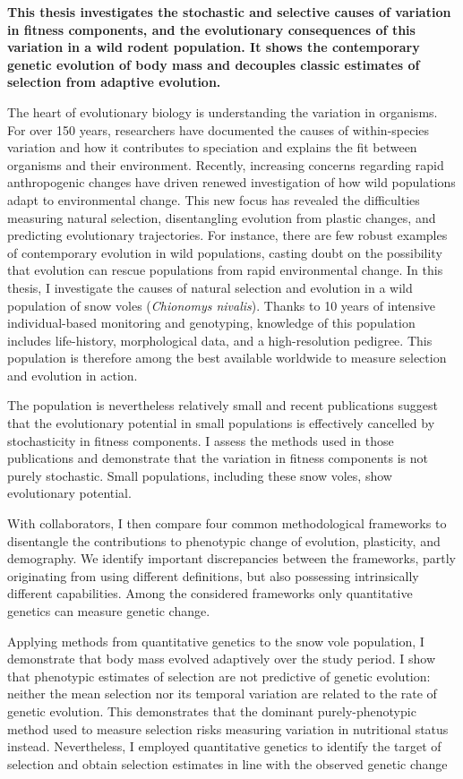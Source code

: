 \begin{summary}
\textbf{
This thesis investigates the stochastic and selective causes of variation in fitness components, and the evolutionary consequences of this variation in a wild rodent population. 
It shows the contemporary genetic evolution of body mass and decouples classic estimates of selection from adaptive evolution. 
}

The heart of evolutionary biology is understanding the variation in organisms. For over 150 years, researchers have documented the causes of within-species variation and how it contributes to speciation and explains the fit between organisms and their environment. 
Recently, increasing concerns regarding rapid anthropogenic changes have driven renewed investigation of how wild populations adapt to environmental change.
This new focus has revealed the difficulties measuring natural selection, disentangling evolution from plastic changes, and predicting evolutionary trajectories. 
For instance, there are few robust examples of contemporary evolution in wild populations, casting doubt on the possibility that evolution can rescue populations from rapid environmental change.
In this thesis, I investigate the causes of natural selection and evolution in a wild population of snow voles (\textit{Chionomys nivalis}). Thanks to 10 years of intensive individual-based monitoring and genotyping, knowledge of this population includes life-history, morphological data, and a high-resolution pedigree. This population is therefore among the best available worldwide to measure selection and evolution in action. 

The population is nevertheless relatively small and recent publications suggest that the evolutionary potential in small populations is effectively cancelled by stochasticity in fitness components. I assess the methods used in those publications and demonstrate that the variation in fitness components is not purely stochastic. Small populations, including these snow voles, show evolutionary potential. 
 
With collaborators, I then compare four common methodological frameworks to disentangle the contributions to phenotypic change of evolution, plasticity, and demography. We identify important discrepancies between the frameworks, partly originating from using different definitions, but also possessing intrinsically different capabilities. Among the considered frameworks only quantitative genetics can measure genetic change.

Applying methods from quantitative genetics to the snow vole population, I demonstrate that body mass evolved adaptively over the study period. I show that phenotypic estimates of selection are not predictive of genetic evolution: neither the mean selection nor its temporal variation are related to the rate of genetic evolution. This demonstrates that the dominant purely-phenotypic method used to measure selection risks measuring variation in nutritional status instead. Nevertheless, I employed quantitative genetics to identify the target of selection and obtain selection estimates in line with the observed genetic change 


\end{summary}
